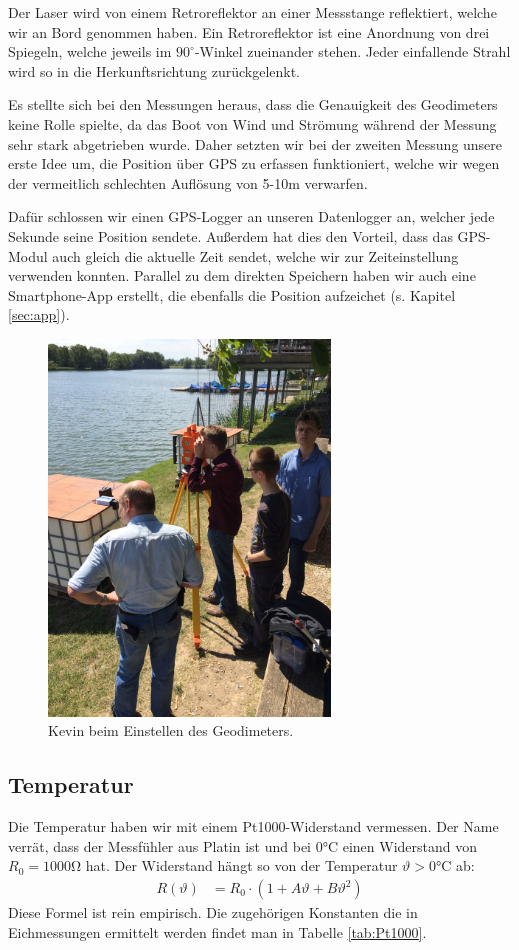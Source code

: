 \documentclass[12pt,a4paper,titlepage,headinclude,bibtotoc]{scrartcl}
\begin{document}
Der Laser wird von einem Retroreflektor an einer Messstange reflektiert, welche wir an Bord genommen haben.
Ein Retroreflektor ist eine Anordnung von drei Spiegeln, welche jeweils im $90^\circ$-Winkel zueinander stehen.
Jeder einfallende Strahl wird so in die Herkunftsrichtung zurückgelenkt.

Es stellte sich bei den Messungen heraus, dass die Genauigkeit des Geodimeters keine Rolle spielte, da das Boot von Wind und Strömung während der Messung sehr stark abgetrieben wurde.
Daher setzten wir bei der zweiten Messung unsere erste Idee um, die Position über GPS zu erfassen funktioniert, welche wir wegen der vermeitlich schlechten Auflösung von 5-10m verwarfen.


Dafür schlossen wir einen GPS-Logger an unseren Datenlogger an, welcher jede Sekunde seine Position sendete.
Außerdem hat dies den Vorteil, dass das GPS-Modul auch gleich die aktuelle Zeit sendet, welche wir zur Zeiteinstellung verwenden konnten.
Parallel zu dem direkten Speichern haben wir auch eine Smartphone-App erstellt, die ebenfalls die Position aufzeichet (s. Kapitel \ref{sec:app}).


\begin{figure}[h]
	\centering
	\includegraphics[height=10cm]{Fotos/Geodimeter}
	\caption{Kevin beim Einstellen des Geodimeters.}
	\label{fig:geodimeter}
\end{figure}


\subsection{Temperatur}
Die Temperatur haben wir mit einem Pt1000-Widerstand vermessen.
Der Name verrät, dass der Messfühler aus Platin ist und bei $0\si{\celsius}$ einen Widerstand von $R_0=1000\si{\ohm}$ hat.
Der Widerstand hängt so von der Temperatur $\vartheta>0\si{\celsius}$ ab:
\begin{align}
	R(\vartheta)&=R_0\cdot\left(1 + A\vartheta + B\vartheta^2\right) \label{eq:Pt1000}
\end{align}
Diese Formel ist rein empirisch. 
Die zugehörigen Konstanten die in Eichmessungen ermittelt werden findet man in Tabelle \ref{tab:Pt1000}.
\end{document}
